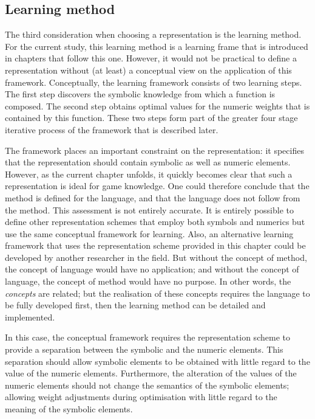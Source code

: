 \subsection*{Learning method}
The third consideration when choosing a representation is the learning method.  For the current study, this learning method is a learning frame that is introduced in chapters that follow this one.  However, it would not be practical to define a representation without (at least) a conceptual view on the application of this framework.  Conceptually, the learning framework consists of two learning steps. The first step discovers the symbolic knowledge from which a function is composed. The second step obtains optimal values for the numeric weights that is contained by this function.  These two steps form part of the greater four stage iterative process of the framework that is described later. 

The framework places an important constraint on the representation:  it specifies that the representation should contain symbolic as well as numeric elements.  However, as the current chapter unfolds, it quickly becomes clear that such a representation is ideal for game knowledge.  One could therefore conclude that the method is defined for the language, and that the language does not follow from the method. This assessment is not entirely accurate. It is entirely possible to define other representation schemes that employ both symbols and numerics but use the same conceptual framework for learning.  Also, an alternative learning framework that uses the representation scheme provided in this chapter could be developed by another researcher in the field.  But without the concept of method, the concept of language would have no application; and without the concept of language, the concept of method would have no purpose.  In other words, the {\it concepts} are related; but the realisation of these concepts requires the language to be fully developed first, then the learning method can be detailed and implemented.  

In this case, the conceptual framework requires the representation scheme to provide a separation between the symbolic and the numeric elements. This separation should allow symbolic elements to be obtained with little regard to the value of the numeric elements. Furthermore, the alteration of the values of the numeric elements should not change the semantics of the symbolic elements; allowing weight adjustments during optimisation with little regard to the meaning of the symbolic elements.

